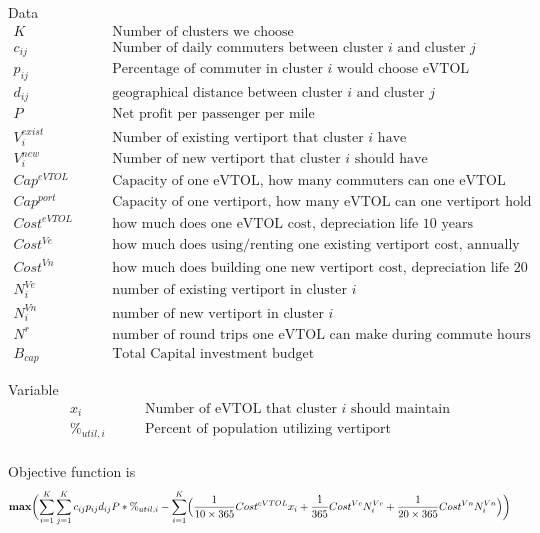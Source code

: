 \documentclass{article}
\begin{document}
Data
\[
\begin{split}
K& \qquad \text{Number of clusters we choose}\\
c_{ij}&  \qquad \text{Number of daily commuters between cluster $i$ and cluster $j$} \\
p_{ij}& \qquad \text{Percentage of commuter in cluster $i$ would choose eVTOL}\\
d_{ij}&  \qquad \text{geographical distance between cluster $i$ and cluster $j$} \\
P & \qquad \text{Net profit per passenger per mile} \\
V^{exist}_i & \qquad \text{Number of existing vertiport that cluster $i$ have} \\
V^{new}_i & \qquad \text{Number of new vertiport that cluster $i$ should have} \\
Cap^{eVTOL} & \qquad \text{Capacity of one eVTOL, how many commuters can one eVTOL hold} \\
Cap^{port} & \qquad \text{Capacity of one vertiport, how many eVTOL can one vertiport hold} \\
Cost^{eVTOL} & \qquad \text{how much does one eVTOL cost, depreciation life 10 years} \\
Cost^{Ve} & \qquad \text{how much does using/renting one existing vertiport cost, annually} \\
Cost^{Vn} & \qquad \text{how much does building one new vertiport cost, depreciation life 20 years} \\
N^{Ve}_i & \qquad \text{number of existing vertiport in cluster $i$} \\
N^{Vn}_i & \qquad \text{number of new vertiport in cluster $i$} \\
N^{r} & \qquad \text{number of round trips one eVTOL can make during commute hours} \\
B_{cap} & \qquad \text{Total Capital investment budget}
\end{split}
\]

Variable
\[
\begin{split}
x_{i}  & \qquad \text{Number of eVTOL that cluster $i$ should maintain}\\
\%_{util,i} & \qquad \text{Percent of population utilizing vertiport}\\
\end{split}
\]


Objective function is 
\[
\textbf{max} \biggl( \sum_{i=1}^K \sum_{j=1}^K c_{ij}p_{ij} d_{ij}P*\%_{util,i}- \sum_{i=1}^K\Bigl( \frac{1}{10\times365}Cost^{eVTOL}x_i + \frac{1}{365}Cost^{Ve}N^{Ve}_i + \frac{1}{20\times365}Cost^{Vn}N^{Vn}_i  \Bigl)\biggl)
\]
\end{document}
